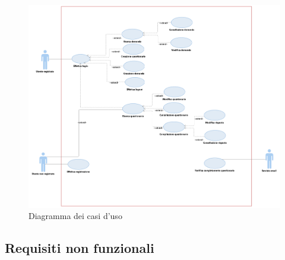 \documentclass[12pt]{article}
\begin{document}
\begin{figure}[H]
\includegraphics[scale=0.45, left]{fig_usecase_diagram.png}
\caption{Diagramma dei casi d'uso}
\end{figure}

\subsection{Requisiti non funzionali}
\end{document}
